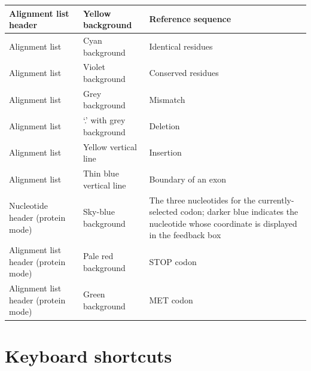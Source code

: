 \documentclass[letterpaper]{article}
\begin{document}
\bigskip

\begin{flushleft}
\tablehead{}
\begin{supertabular}{p{3.8009999cm}p{3.552cm}p{6.3cm}}
 Alignment list header &
 Yellow background &
 Reference sequence\\\hline
 Alignment list &
 Cyan background &
 Identical residues\\\hline
 Alignment list &
 Violet background &
 Conserved residues\\\hline
 Alignment list &
 Grey background &
 Mismatch\\\hline
 Alignment list &
 {\textquoteleft}.{\textquoteright} with grey
background &
 Deletion\\\hline
 Alignment list &
 Yellow vertical line &
 Insertion\\\hline
 Alignment list &
 Thin blue vertical line &
 Boundary of an exon\\\hline
 Nucleotide header (protein mode) &
 Sky-blue background &
 The three nucleotides for the
currently-selected codon; darker blue indicates the nucleotide whose
coordinate is displayed in the feedback box\\\hline
 Alignment list header (protein mode) &
 Pale red background &
 STOP codon\\\hline
 Alignment list header (protein mode) &
 Green background &
 MET codon\\
\end{supertabular}
\end{flushleft}

{\color[rgb]{0.0,0.27058825,0.5254902}\section[Keyboard shortcuts]{Keyboard shortcuts}}
\hypertarget{RefHeading2701056909880}{}
\bigskip
\end{document}
